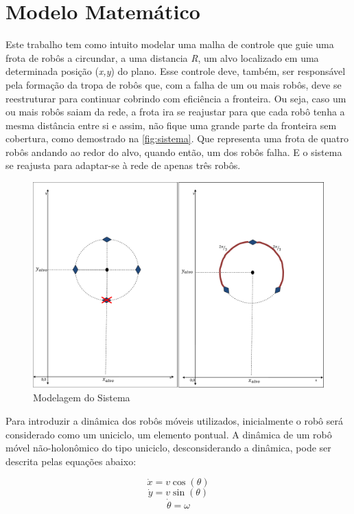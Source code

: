 \section{Modelo Matemático}
\label{sec:modMatematico}
Este trabalho tem como intuito modelar uma malha de controle que guie uma frota de robôs a circundar, a uma distancia \emph{R}, um alvo localizado em uma determinada posição (\emph{x,y}) do plano. Esse controle deve, também, ser responsável pela formação da tropa de robôs que, com a falha de um ou mais robôs, deve se reestruturar para continuar cobrindo com eficiência a fronteira. Ou seja, caso um ou mais robôs saiam da rede, a frota ira se reajustar para que cada robô tenha a mesma distância entre si e assim, não fique uma grande parte da fronteira sem cobertura, como demostrado na \autoref{fig:sistema}. Que representa uma frota de quatro robôs andando ao redor do alvo, quando então, um dos robôs falha. E o sistema se reajusta para adaptar-se à rede de apenas três robôs.

\begin{figure}[!htb]
	\centering
	\includegraphics[width=1.0\textwidth]{./04-figuras/sistema}
	\caption{Modelagem do Sistema}
	\label{fig:sistema}
\end{figure}

Para introduzir a dinâmica dos robôs móveis utilizados, inicialmente o robô será considerado como um uniciclo, um elemento pontual. A dinâmica de um robô móvel não-holonômico do tipo uniciclo, desconsiderando a dinâmica, pode ser descrita pelas equações abaixo:

\begin{equation}
\dot{x} = v\cos(\theta) 
\label{eq:posiçãox}
\end{equation}
\begin{equation}
\dot{y} = v\sin(\theta)
\label{eq:posiçãoy}
\end{equation}
\begin{equation}
\dot{\theta} = \omega
\label{eq:posiçãotheta}
\end{equation}

